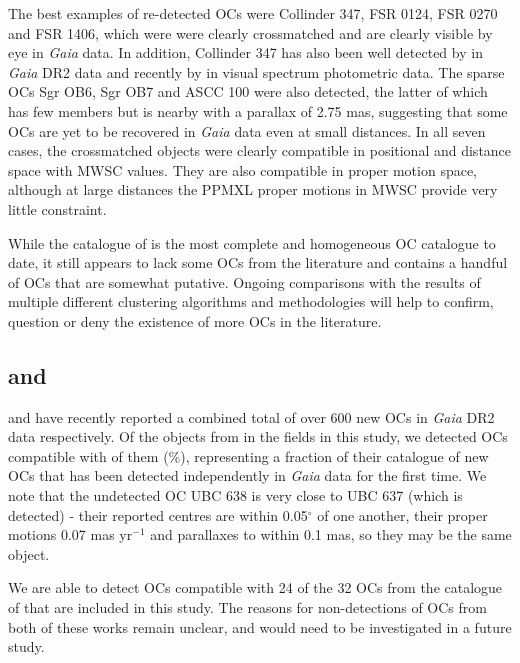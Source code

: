 The best examples of re-detected OCs were Collinder 347, FSR 0124, FSR 0270 and FSR 1406, which were were clearly crossmatched and are clearly visible by eye in \emph{Gaia} data. In addition, Collinder 347 has also been well detected by \cite{piatti_extended_2019} in \emph{Gaia} DR2 data and recently by \cite{claria_ccd_2019} in visual spectrum photometric data. The sparse OCs Sgr OB6, Sgr OB7 and ASCC 100 were also detected, the latter of which has few members but is nearby with a parallax of 2.75 mas, suggesting that some OCs are yet to be recovered in \emph{Gaia} data even at small distances. In all seven cases, the crossmatched objects were clearly compatible in positional and distance space with MWSC values. They are also compatible in proper motion space, although at large distances the PPMXL proper motions in MWSC provide very little constraint.

While the catalogue of \cite{cantat-gaudin_clusters_2020} is the most complete and homogeneous OC catalogue to date, it still appears to lack some OCs from the literature and contains a handful of OCs that are somewhat putative. Ongoing comparisons with the results of multiple different clustering algorithms and methodologies will help to confirm, question or deny the existence of more OCs in the literature.


\subsection{\cite{castro-ginard_hunting_2020} and \cite{liu_catalog_2019}}

\cite{castro-ginard_hunting_2020} and \cite{liu_catalog_2019} have recently reported a combined total of over 600 new OCs in \emph{Gaia} DR2 data respectively. Of the objects from \cite{castro-ginard_hunting_2020} in the fields in this study, we detected OCs compatible with of them (\%), representing a fraction of their catalogue of new OCs that has been detected independently in \emph{Gaia} data for the first time. We note that the undetected OC UBC 638 is very close to UBC 637 (which is detected) - their reported centres are within 0.05$^{\circ}$ of one another, their proper motions 0.07 mas yr$^{-1}$ and parallaxes to within 0.1 mas, so they may be the same object.

We are able to detect OCs compatible with 24 of the 32 OCs from the catalogue of \cite{liu_catalog_2019} that are included in this study. The reasons for non-detections of OCs from both of these works remain unclear, and would need to be investigated in a future study.



